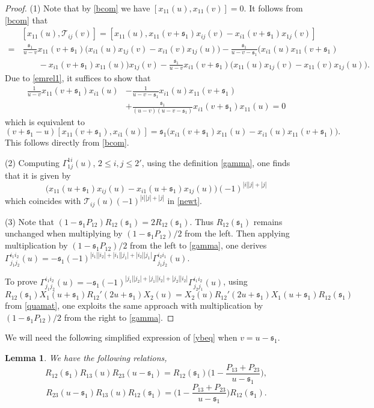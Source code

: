 \documentclass[11pt,reqno]{amsart}
\numberwithin{equation}{section}
\newtheorem{lem}[thm]{Lemma}
\theoremstyle{definition}
\theoremstyle{remark}
\newcommand{\be}{\begin{equation*}}
\newcommand{\ee}{\end{equation*}}
\newcommand{\mc}{\mathcal}
\newcommand{\lle}{\leqslant}
\newcommand{\ka}{{\mathfrak s}}
\begin{document}
\begin{proof}
(1) Note that by \eqref{bcom} we have $[x_{11}(u),x_{11}(v)]=0$. It follows from \eqref{bcom} that
\begin{align*}
&[x_{11}(u),\mc T_{ij}(v)]=[x_{11}(u),x_{11}(v+\ka_1)x_{ij}(v)-x_{i1}(v+\ka_1)x_{1j}(v)]\\
=&\,\frac{\ka_1}{u-v}x_{11}(v+\ka_1)\big(x_{i1}(u)x_{1j}(v)- x_{i1}(v)x_{1j}(u) \big)-\frac{\ka_1}{u-v-\ka_1}\big(x_{i1}(u)x_{11}(v+\ka_1)\\
&\qquad   -x_{i1}(v+\ka_1)x_{11}(u)\big)x_{1j}(v)-\frac{\ka_1}{u-v}x_{i1}(v+\ka_1)\big(x_{11}(u)x_{1j}(v)- x_{11}(v)x_{1j}(u) \big).
\end{align*}
Due to \eqref{emrel1}, it suffices to show that
\begin{align*}
\frac{1}{u-v}x_{11}(v+\ka_1)x_{i1}(u)&-\frac{1}{u-v-\ka_1}x_{i1}(u)x_{11}(v+\ka_1)\\
&+\frac{\ka_1}{(u-v)(u-v-\ka_1)}x_{i1}(v+\ka_1)x_{11}(u)=0
\end{align*}
which is equivalent to
\[
(v+\ka_1-u)[x_{11}(v+\ka_1),x_{i1}(u)]=\ka_1\big(x_{i1}(v+\ka_1)x_{11}(u)-x_{i1}(u)x_{11}(v+\ka_1)\big).
\]
This follows directly from \eqref{bcom}.

(2) Computing $\Gamma_{1j}^{1i}(u)$, $2\lle i,j\lle 2'$, using the definition \eqref{gamma}, one finds that it is given by 
$$
\big(x_{11}(u+\ka_1)x_{ij}(u)-x_{i1}(u+\ka_1)x_{1j}(u)\big)(-1)^{|i||j|+|j|}
$$ 
which coincides with $\mc T_{ij}(u)(-1)^{|i||j|+|j|}$ in \eqref{newt}.

(3) Note that $(1-\ka_1P_{12}) R_{12}(\ka_1)=2R_{12}(\ka_1)$. Thus $R_{12}(\ka_1)$ remains unchanged when multiplying by $(1-\ka_1P_{12})/2$ from the left. Then applying multiplication by $(1-\ka_1P_{12})/2$ from the left to \eqref{gamma}, one derives $\Gamma_{j_1j_2}^{i_1i_2}(u)=-\ka_1(-1)^{|i_1||i_2|+|i_1||j_1|+|i_2||j_1|}\Gamma_{j_1j_2}^{i_2i_1}(u)$. 

To prove $\Gamma_{j_1j_2}^{i_1i_2}(u)=-\ka_1(-1)^{|j_1||j_2|+|j_1||i_2|+|j_2||i_2|}\Gamma_{j_2j_1}^{i_1i_2}(u)$, using
\[
R_{12}(\ka_1)X_1(u+\ka_1){R}_{12}'(2u+\ka_1)X_2(u)=X_2(u){R}_{12}'(2u+\ka_1)X_1(u+\ka_1)R_{12}(\ka_1)
\]
from \eqref{quamat}, one exploits the same approach with  multiplication by $(1-\ka_1P_{12})/2$ from the right to \eqref{gamma}.
\end{proof}

We will need the following simplified expression of \eqref{ybeq} when $v=u-\ka_1$.
\begin{lem}\label{Rsim}
We have the following relations,
\be
R_{12}(\ka_1)R_{13}(u)R_{23}(u-\ka_1)=R_{12}(\ka_1)\Big(1-\frac{P_{13}+P_{23}}{u-\ka_1}\Big),
\ee
\be
R_{23}(u-\ka_1)R_{13}(u)R_{12}(\ka_1)=\Big(1-\frac{P_{13}+P_{23}}{u-\ka_1}\Big)R_{12}(\ka_1).
\ee
\end{lem}
\end{document}
